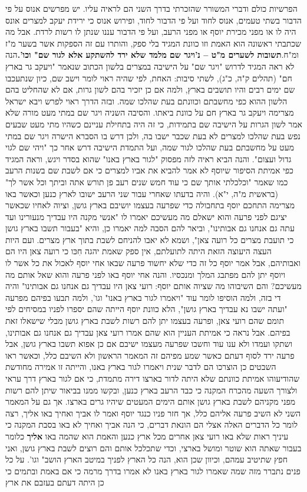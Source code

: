 \documentclass[12pt, openany]{book}
\begin{document}
הפרשיות כולם ודברי המשורר שהזכרתי בדרך השני הם לראיה עליו. יש מפרשים אנוס על פי הדבור בשתי טעמים, אנוס לחוד ועל פי הדבור לחוד, ופירוש אנוס כי ירידת יעקב למצרים אונס היה לו או מפני מכירת יוסף או מפני הרעב, ועל פי הדבור עננו שנתן לו רשות לרדת. אבל מה שכתבתי ראשונה הוא האמת וזו כוונת המגיד בלי ספק, והותרו עם זה הספקות אשר בשער מ"ז ומ"ח.\textrm{\textbf{תשובות לשערים מ"ט – נ'}}\textrm{\textbf{ויגר שם מלמד שלא ירד להשתקע אלא לגור שם" וכו'.}}הנה לא ראה המגיד לדרוש "ויגר שם" על הישיבה במצרים בלשון הכתוב שנאמר "ויעקב גר בארץ חם" (תהלים ק"ה, כ"ג), לשתי סיבות: האחת, לפי שהיה ראוי לומר וישב שם, כיון שנתעכבו שם ימים רבים והיו תושבים בארץ, ולמה אם כן יזכיר בהם לשון גרות, אם לא שהחליט בהם הלשון ההוא כפי מחשבתם וכוונתם בעת שהלכו שמה. ובזה הדרך ראוי לפרש ויבא ישראל מצרימה ויעקב גר בארץ חם על כוונת ביאתו. והסיבה השניה ויגר שם במתי מעט מורה שלא אמר לשון הגרות על הישיבה שם בתמידות, כי זה היה בתחילת עניינם כשהיו מתי מעט שבעים נפש בעת שהלכו למצרים לא בעת שכבר ישבו בה, ולכן דרש בו הסברא הישרה ויגר שם במתי מעט על מחשבתם בעת שהלכו לגור שמה, ועל התמדת הישיבה דרש אחר כך "ויהי שם לגוי גדול ועצום". והנה הביא ראיה לזה מפסוק "לגור בארץ באנו" שהוא בסדר ויגש, וראה המגיד כפי אמיתת הסיפור שיוסף לא אמר להביא את אביו למצרים כי אם לשבת שם בשנות  הרעב כמו שאמר "וכלכלתי אותך שם כי עוד חמש שנים רעב פן תורש אתה וביתך וכל אשר לך" (בראשית מ"ה, י"א). והיה בדעתו שאחרי עבור שני הרעב ישובו לארץ כנען וכאשר באו מצרימה התחכם יוסף בתחבולה כדי שפרעה בעצמו יושיבם בארץ גושן, וציוה לאחיו שכאשר יציגם לפני פרעה והוא ישאלם מה מעשיכם יאמרו לו "אנשי מקנה היו עבדיך מנעורינו ועד עתה גם אנחנו גם אבותינו", וביאר להם הסבה למה יאמרו כן, והיא "בעבור תשבו בארץ גושן כי תועבת מצרים כל רועה צאן", ושמא לא יאבו להניחם לשבת בתוך ארץ מצרים. ועם היות העצה היעוצה הזאת היתה לתועלתם, אין ספק שאמת יהגה חִכּו כי רועה צאן היו הם ואבותיהם, אבל אמר יוסף כל זה כדי שלא יחשוד פרעה שבאו אחי יוסף לאכול את כל אשר לו ויוסף יתן להם מפתבג המלך ומנכסיו. והנה אחי יוסף באו לפני פרעה והוא שאל אותם מה מעשיכם? והם השיבוהו מה שציוה אותם יוסף: רועי צאן היו עבדיך גם אנחנו גם אבותינו" והיה די בזה, ולמה הוסיפו לומר עוד  "ויאמרו לגור בארץ באנו" וגו', ולמה תבעו בפיהם מפרעה "ועתה ישבו נא עבדיך בארץ גושן", הלא כוונת יוסף הייתה שהם יספרו לפניו במסיחים לפי תומם שהם רועי צאן, ופרעה בעצמו יתן להם רשות לשבת בארץ גושן מבלי שישאלו זאת בפיהם. אבל נראה כי אמיתת העניין הוא שהם אמרו רועי צאן עבדיך גם אנחנו גם אבותינו, ושתקו ועמדו ולא ענו עוד וחשבו שפרעה מעצמו ישיבם אם כן אפוא תשבו בארץ גושן, אבל פרעה ירד לסוף דעתם כאשר שמע מפיהם זה המאמר הראשון ולא השיבם כלל,  וכאשר ראו השבטים כן הוצרכו הם לדבר שנית ויאמרו לגור בארץ באנו, והייתה זו אמירה מחודשת שהודיעוהו אמיתת כוונתם שלא היתה לדור בארצו דירה מתמדת, כי אם לגור בארץ דרך עראי ולצורך השעה מהכרח המקנה כי כבד הרעב בארץ כנען, ובקשו ממנו בביאור שיתן להם רשות מפני מקניהם לשבת בארץ גושן אותם הימים המעטים שיהיו גרים בארצו. אך גם על המאמר השני לא השיב פרעה אליהם כלל, אך חזר פניו כנגד יוסף ואמר לו אביך ואחיך באו אליך, רצה לומר כל הדברים האלה אצלי הם הונאת דברים, כי הנה אביך ואחיך לא באו בסבת המקנה כי עיניך ראות שלא באו רועי צאן אחרים מכל ארץ כנען והאמת הוא שהמה באו \textrm{\textbf{אליך}} כלומר בעבור שאתה הוא שוטר ומושל בארצי, וכדי שתכלכל אותם והם רוצים לשבת בארץ גושן, ואני חפץ שתיטיב עמהם, וכיוון שכן הוא, הנה כל הארץ לפניך במיטב הארץ הושב" וגו'. על כל פנים נתברר מזה שמה שאמרו לגור בארץ באנו לא אמרו בדרך מרמה כי אם באמת ובתמים כי כן היתה דעתם בעזבם את ארץ 
\end{document}

